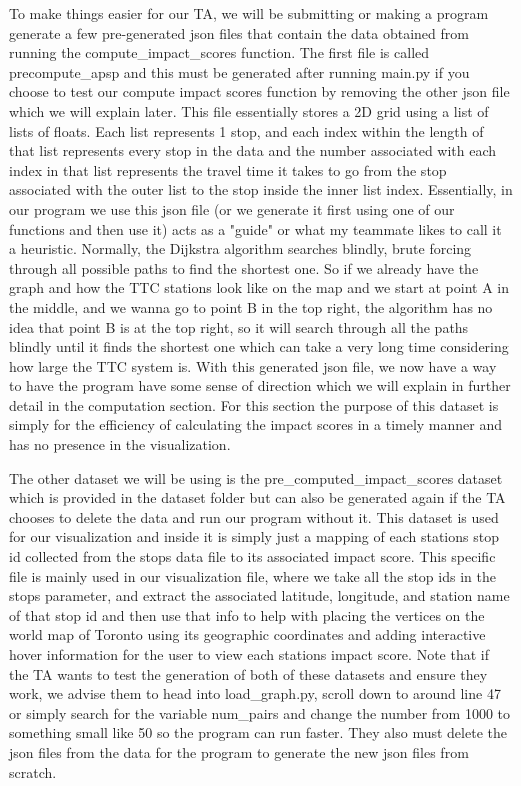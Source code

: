 \documentclass[fontsize=11pt]{article}
\begin{document}
To make things easier for our TA, we will be submitting or making a program generate a few pre-generated json files that contain the data obtained from running the compute\_impact\_scores function. The first file is called precompute\_apsp and this must be generated after running main.py if you choose to test our compute impact scores function by removing the other json file which we will explain later. This file essentially stores a 2D grid using a list of lists of floats. Each list represents 1 stop, and each index within the length of that list represents every stop in the data and the number associated with each index in that list represents the travel time it takes to go from the stop associated with the outer list to the stop inside the inner list index. Essentially, in our program we use this json file (or we generate it first using one of our functions and then use it) acts as a "guide" or what my teammate likes to call it a heuristic. Normally, the Dijkstra algorithm searches blindly, brute forcing through all possible paths to find the shortest one. So if we already have the graph and how the TTC stations look like on the map and we start at point A in the middle, and we wanna go to point B in the top right, the algorithm has no idea that point B is at the top right, so it will search through all the paths blindly until it finds the shortest one which can take a very long time considering how large the TTC system is. With this generated json file, we now have a way to have the program have some sense of direction which we will explain in further detail in the computation section. For this section the purpose of this dataset is simply for the efficiency of calculating the impact scores in a timely manner and has no presence in the visualization.

\vspace{1em}

The other dataset we will be using is the pre\_computed\_impact\_scores dataset which is provided in the dataset folder but can also be generated again if the TA chooses to delete the data and run our program without it. This dataset is used for our visualization and inside it is simply just a mapping of each stations stop id collected from the stops data file to its associated impact score. This specific file is mainly used in our visualization file, where we take all the stop ids in the stops parameter, and extract the associated latitude, longitude, and station name of that stop id and then use that info to help with placing the vertices on the world map of Toronto using its geographic coordinates and adding interactive hover information for the user to view each stations impact score. Note that if the TA wants to test the generation of both of these datasets and ensure they work, we advise them to head into load\_graph.py, scroll down to around line 47 or simply search for the variable num\_pairs and change the number from 1000 to something small like 50 so the program can run faster. They also must delete the json files from the data for the program to generate the new json files from scratch.
\end{document}
